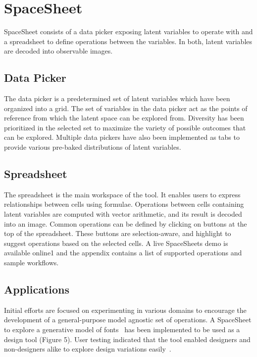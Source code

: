 \documentclass[letterpaper]{article}
\begin{document}
\section{SpaceSheet}

SpaceSheet consists of a data picker exposing latent variables to operate with and a spreadsheet to define operations between the variables. In both, latent variables are decoded into observable images.

\subsection{Data Picker}

The data picker is a predetermined set of latent variables which have been organized into a grid. The set of variables in the data picker act as the points of reference from which the latent space can be explored from. Diversity has been prioritized in the selected set to maximize the variety of possible outcomes that can be explored. Multiple data pickers have also been implemented as tabs to provide various pre-baked distributions of latent variables.

\subsection{Spreadsheet}

The spreadsheet is the main workspace of the tool. It enables users to express relationships between cells using formulae. Operations between cells containing latent variables are computed with vector arithmetic, and its result is decoded into an image. Common operations can be defined by clicking on buttons at the top of the spreadsheet. These buttons are selection-aware, and highlight to suggest operations based on the selected cells. A live SpaceSheets demo is available online1 and the appendix contains a list of supported operations and sample workflows.

\subsection{Applications}

Initial efforts are focused on experimenting in various domains to encourage the development of a general-purpose model agnostic set of operations. A SpaceSheet to explore a generative model of fonts~\cite{bernhardsson15} has been implemented to be used as a design tool (Figure 5). User testing indicated that the tool enabled designers and non-designers alike to explore design variations easily~\cite{loh18}.
\end{document}
